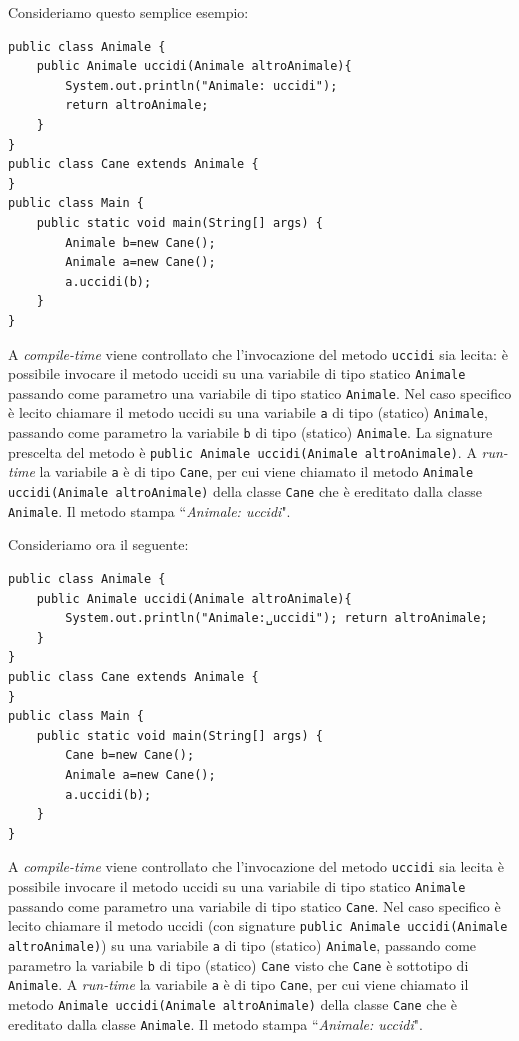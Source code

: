 \documentclass{article}
\begin{document}
Consideriamo questo semplice esempio:

\begin{lstlisting}
public class Animale {
    public Animale uccidi(Animale altroAnimale){
        System.out.println("Animale: uccidi"); 
        return altroAnimale;
    }
}
public class Cane extends Animale { 
}
public class Main {
    public static void main(String[] args) { 
        Animale b=new Cane();
        Animale a=new Cane();
        a.uccidi(b);
    } 
}
\end{lstlisting}

A \emph{compile-time} viene controllato che l'invocazione del metodo \texttt{uccidi} sia lecita: \`e possibile invocare il metodo uccidi su una variabile di tipo statico \texttt{Animale} passando come parametro una variabile di tipo statico \texttt{Animale}. Nel caso specifico \`e lecito chiamare il metodo uccidi su una variabile \texttt{a} di tipo (statico) \texttt{Animale}, passando come parametro la variabile \texttt{b} di tipo (statico) \texttt{Animale}. La signature prescelta del metodo \`e \texttt{public Animale uccidi(Animale altroAnimale)}. A \emph{run-time} la variabile \texttt{a} \`e di tipo \texttt{Cane}, per cui viene chiamato il metodo \texttt{Animale uccidi(Animale altroAnimale)} della classe \texttt{Cane} che \`e ereditato dalla classe \texttt{Animale}. Il metodo stampa ``\textit{Animale: uccidi}".

Consideriamo ora il seguente:
\begin{lstlisting}
public class Animale {
    public Animale uccidi(Animale altroAnimale){
        System.out.println("Animale:␣uccidi"); return altroAnimale;
    }
}
public class Cane extends Animale { 
}
public class Main {
    public static void main(String[] args) { 
        Cane b=new Cane();
        Animale a=new Cane();
        a.uccidi(b);
    } 
}
\end{lstlisting}

A \emph{compile-time} viene controllato che l'invocazione del metodo \texttt{uccidi} sia lecita \`e possibile invocare il metodo uccidi su una variabile di tipo statico \texttt{Animale} passando come parametro una variabile di tipo statico \texttt{Cane}. Nel caso specifico \`e lecito chiamare il metodo uccidi (con signature \texttt{public Animale uccidi(Animale altroAnimale)}) su una variabile \texttt{a} di tipo (statico) \texttt{Animale}, passando come parametro la variabile \texttt{b} di tipo (statico) \texttt{Cane} visto che \texttt{Cane} \`e sottotipo di \texttt{Animale}. A \emph{run-time} la variabile \texttt{a} \`e di tipo \texttt{Cane}, per cui viene chiamato il metodo \texttt{Animale uccidi(Animale altroAnimale)} della classe \texttt{Cane} che \`e ereditato dalla classe \texttt{Animale}. Il metodo stampa ``\textit{Animale: uccidi}".
\end{document}

